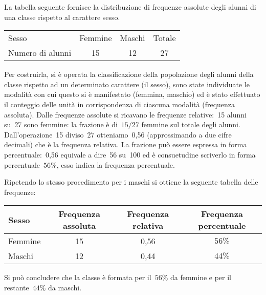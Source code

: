  \begin{esempio}

La tabella seguente fornisce la distribuzione di frequenze assolute degli 
alunni di una classe rispetto al carattere sesso.

\begin{center}
\begin{tabular}{lccc}
\toprule
Sesso &Femmine &Maschi &Totale \\
Numero di alunni & 15 & 12 & 27 \\
\bottomrule
\end{tabular}
\end{center}

Per costruirla, si è operata la classificazione della popolazione degli 
alunni della classe rispetto ad un determinato carattere (il sesso),
sono state individuate le modalità con cui questo si è manifestato 
(femmina, maschio) ed è stato effettuato il conteggio delle unità
in corrispondenza di ciascuna modalità (frequenza assoluta).
Dalle frequenze assolute si ricavano le frequenze relative:~15 alunni su~27 
sono femmine: la frazione è di~\(15/27\) femmine sul totale degli alunni. 
Dall'operazione~15
diviso~27 otteniamo~0,56 (approssimando a due cifre decimali) che è la 
frequenza relativa.
La frazione può essere espressa in forma percentuale:~0,56 equivale a 
dire~56 su~100 ed è consuetudine scriverlo in forma percentuale~\(56\%\),
esso indica la frequenza percentuale.

Ripetendo lo stesso procedimento per i maschi si ottiene la seguente 
tabella delle frequenze:

\begin{center}
\begin{tabular}{lccc}
\toprule
Sesso & Frequenza assoluta & Frequenza relativa & Frequenza percentuale \\
\midrule
Femmine & 15 & 0,56 & \(56\%\) \\
Maschi & 12 & 0,44 & \(44\%\) \\
\bottomrule
\end{tabular}
\end{center}
Si può concludere che la classe è formata per il~\(56\%\) da femmine e per il 
restante~\(44\%\) da maschi.
 \end{esempio}

